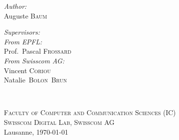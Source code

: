 \begin{titlepage}
\begin{center}
    \begin{minipage}[t]{0.4\textwidth}
    \begin{flushleft} \large
    \emph{Author:}\\
    Auguste \textsc{Baum}
    \end{flushleft}
    \end{minipage}
    \begin{minipage}[t]{0.4\textwidth}
    \begin{flushright} \large
    \emph{Supervisors:} \\
    [0.5cm]
    \emph{From EPFL:}\\
    Prof.~Pascal \textsc{Frossard}\\
    [0.2cm]
    \emph{From Swisscom AG:}\\
    Vincent \textsc{Coriou}\\
    Natalie~\textsc{Bolon~Brun}
    \end{flushright}
    \end{minipage}\\[3cm]
     
    \vfill
    
    \small{\textsc{Faculty of Computer and Communication Sciences (IC)}}\\
    \small{\textsc{Swisscom Digital Lab, Swisscom AG}}\\
    [1cm]
    
    {\large Lausanne, \today}\\[2cm] %
     
    \end{center}
\end{titlepage}